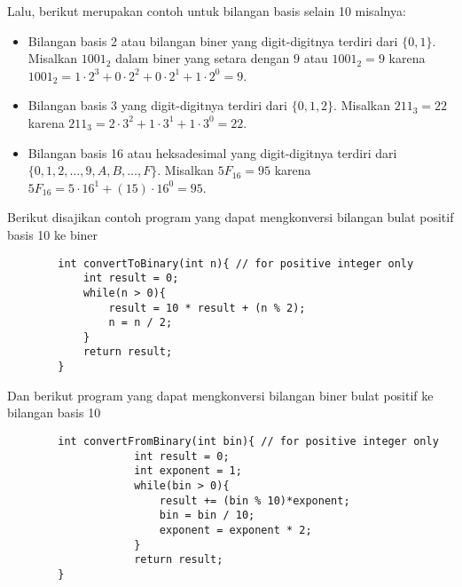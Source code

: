         Lalu, berikut merupakan contoh untuk bilangan basis selain 10 misalnya: 
        \begin{itemize}
            \item Bilangan basis 2 atau bilangan biner yang digit-digitnya terdiri dari $\{0,1\}$. Misalkan $1001_2$ dalam biner yang setara dengan $9$ atau $1001_2 = 9$ karena $1001_2 = 1\cdot 2^3+0\cdot 2^2+0\cdot 2^1+1\cdot 2^0 = 9$. 
            \item Bilangan basis 3 yang digit-digitnya terdiri dari $\{0,1,2\}$. Misalkan $211_3 = 22$ karena $211_3 = 2\cdot 3^2+ 1\cdot 3^1+ 1\cdot 3^0 = 22$.
            \item Bilangan basis 16 atau heksadesimal yang digit-digitnya terdiri dari $\{0,1,2,\dots,9,A,B,\dots,F\}$. Misalkan $5F_{16} = 95$ karena $5F_{16} = 5 \cdot 16^1 + (15)\cdot 16^0 = 95$.
        \end{itemize}
        Berikut disajikan contoh program yang dapat mengkonversi bilangan bulat positif basis 10 ke biner
        \begin{lstlisting}
        int convertToBinary(int n){ // for positive integer only
        	int result = 0;
        	while(n > 0){
        		result = 10 * result + (n % 2);
        		n = n / 2;
        	}
        	return result;
        }
        \end{lstlisting}
        Dan berikut program yang dapat mengkonversi bilangan biner bulat positif ke bilangan basis 10
        \begin{lstlisting}
        int convertFromBinary(int bin){ // for positive integer only
                	int result = 0;
                	int exponent = 1;
                	while(bin > 0){
                		result += (bin % 10)*exponent;
                		bin = bin / 10;
                		exponent = exponent * 2;
                	}
                	return result;
        }
        \end{lstlisting}
    
